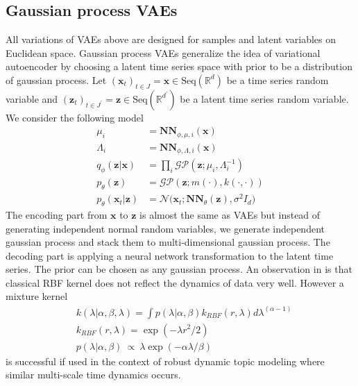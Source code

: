 \documentclass[12pt]{report}
\theoremstyle{definition}
\theoremstyle{remark}
\newcommand{\R}{\mathbb{R}}
\begin{document}
\subsection{Gaussian process VAEs}

All variations of VAEs above are designed for samples and latent variables on Euclidean space. Gaussian process VAEs \cite{fortuin2020gp}generalize the idea of variational autoencoder by choosing a latent time series space with prior to be a distribution of gaussian process. Let $(\mathbf{x}_{t})_{t\in J} = \mathbf{x} \in \text{Seq}(\R^{d})$ be a time series random variable and $(\mathbf{z}_{t})_{t\in J^{\prime}} = \mathbf{z} \in \text{Seq}(\R^{d^{\prime}})$ be a latent time series random variable. We consider the following model 
\begin{equation}
    \begin{split}
      \mu_{i} &= \mathbf{NN}_{\phi,\mu,i}(\mathbf{x})\\
      \Lambda_{i} &= \mathbf{NN}_{\phi,\Lambda,i}(\mathbf{x})\\
      q_{\phi}(\mathbf{z}|\mathbf{x}) &= \prod_{i}\mathcal{GP}(\mathbf{z};\mu_{i},\Lambda_{i}^{-1})\\
      p_{\theta}(\mathbf{z}) &= \mathcal{GP}(\mathbf{z};m(\cdot),k(\cdot,\cdot))\\
      p_{\theta}(\mathbf{x}_{t}|\mathbf{z}) &= \mathcal{N}\Big(\mathbf{x}_{t};\mathbf{NN}_{\theta}(\mathbf{z}),\sigma^{2}I_{d}\Big)
    \end{split}
  \end{equation}
  The encoding part from $\mathbf{x}$ to $\mathbf{z}$ is almost the same as VAEs but instead of generating independent normal random variables, we generate independent gaussian process and stack them to multi-dimensional gaussian process. The decoding part is applying a neural network transformation to the latent time series. The prior can be chosen as any gaussian process. An observation in \cite{fortuin2020gp} is that classical RBF kernel does not reflect the dynamics of data very well. However a mixture kernel 
  \begin{equation}
    \begin{split}
      &k(\lambda|\alpha,\beta,\lambda) = \int p(\lambda |\alpha,\beta)k_{RBF}(r,\lambda)d\lambda^{(\alpha - 1)} \\
      &k_{RBF}(r,\lambda) = \exp(-\lambda r^{2}/2)\\
      &p(\lambda |\alpha,\beta) ~\propto ~\lambda \exp(−\alpha\lambda/\beta)
    \end{split}
  \end{equation}
 is successful if used in the context of robust dynamic topic modeling where similar multi-scale time dynamics occurs.
\end{document}
